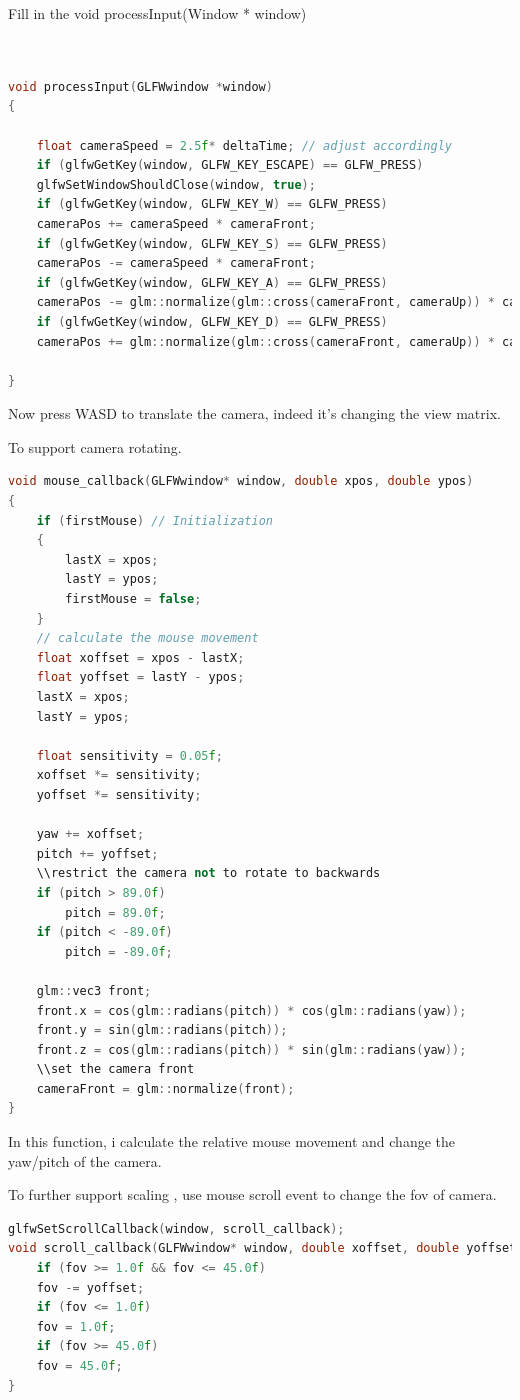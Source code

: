 \documentclass[acmtog]{acmart}
\begin{document}
Fill in the void processInput(Window * window)
\begin{lstlisting}[frame=single,breaklines=true,language=c++,basicstyle=\footnotesize\ttfamily]


void processInput(GLFWwindow *window)
{
	
	float cameraSpeed = 2.5f* deltaTime; // adjust accordingly
	if (glfwGetKey(window, GLFW_KEY_ESCAPE) == GLFW_PRESS)
	glfwSetWindowShouldClose(window, true);
	if (glfwGetKey(window, GLFW_KEY_W) == GLFW_PRESS)
	cameraPos += cameraSpeed * cameraFront;
	if (glfwGetKey(window, GLFW_KEY_S) == GLFW_PRESS)
	cameraPos -= cameraSpeed * cameraFront;
	if (glfwGetKey(window, GLFW_KEY_A) == GLFW_PRESS)
	cameraPos -= glm::normalize(glm::cross(cameraFront, cameraUp)) * cameraSpeed;
	if (glfwGetKey(window, GLFW_KEY_D) == GLFW_PRESS)
	cameraPos += glm::normalize(glm::cross(cameraFront, cameraUp)) * cameraSpeed;

}
\end{lstlisting}
\par Now press WASD to translate the camera, indeed it's changing the view matrix.
\par To support camera rotating. 
\begin{lstlisting}[frame=single,breaklines=true,language=c++,basicstyle=\footnotesize\ttfamily]
void mouse_callback(GLFWwindow* window, double xpos, double ypos)
{
	if (firstMouse) // Initialization 
	{
		lastX = xpos;
		lastY = ypos;
		firstMouse = false;
	}
	// calculate the mouse movement
	float xoffset = xpos - lastX;
	float yoffset = lastY - ypos; 
	lastX = xpos;
	lastY = ypos;

	float sensitivity = 0.05f;
	xoffset *= sensitivity;
	yoffset *= sensitivity;

	yaw += xoffset;
	pitch += yoffset;
	\\restrict the camera not to rotate to backwards
	if (pitch > 89.0f)
		pitch = 89.0f;
	if (pitch < -89.0f)
		pitch = -89.0f;
	
	glm::vec3 front;
	front.x = cos(glm::radians(pitch)) * cos(glm::radians(yaw));
	front.y = sin(glm::radians(pitch));
	front.z = cos(glm::radians(pitch)) * sin(glm::radians(yaw));
	\\set the camera front
	cameraFront = glm::normalize(front);
}
\end{lstlisting}
In this function, i calculate the relative mouse movement  and change the yaw/pitch of the camera. 

To further support scaling , use mouse scroll event to change the fov of camera.
\begin{lstlisting}[frame=single,breaklines=true,language=c++,basicstyle=\footnotesize\ttfamily]
glfwSetScrollCallback(window, scroll_callback);
void scroll_callback(GLFWwindow* window, double xoffset, double yoffset) {
	if (fov >= 1.0f && fov <= 45.0f)
	fov -= yoffset;
	if (fov <= 1.0f)
	fov = 1.0f;
	if (fov >= 45.0f)
	fov = 45.0f;
}
\end{lstlisting}
\end{document}
